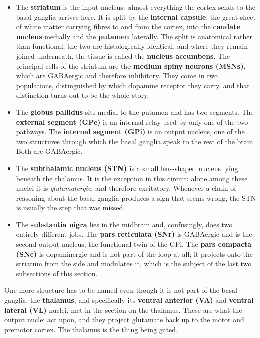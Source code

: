\documentclass[11pt]{article}
\begin{document}
\begin{itemize}
    \item The \textbf{striatum} is the input nucleus: almost everything the cortex sends to the basal ganglia arrives here. It is split by the \textbf{internal capsule}, the great sheet of white matter carrying fibres to and from the cortex, into the \textbf{caudate nucleus} medially and the \textbf{putamen} laterally. The split is anatomical rather than functional; the two are histologically identical, and where they remain joined underneath, the tissue is called the \textbf{nucleus accumbens}. The principal cells of the striatum are the \textbf{medium spiny neurons (MSNs)}, which are GABAergic and therefore inhibitory. They come in two populations, distinguished by which dopamine receptor they carry, and that distinction turns out to be the whole story.
    \item The \textbf{globus pallidus} sits medial to the putamen and has two segments. The \textbf{external segment (GPe)} is an internal relay used by only one of the two pathways. The \textbf{internal segment (GPi)} is an output nucleus, one of the two structures through which the basal ganglia speak to the rest of the brain. Both are GABAergic.
    \item The \textbf{subthalamic nucleus (STN)} is a small lens-shaped nucleus lying beneath the thalamus. It is the exception in this circuit: alone among these nuclei it is \textit{glutamatergic}, and therefore excitatory. Whenever a chain of reasoning about the basal ganglia produces a sign that seems wrong, the STN is usually the step that was missed.
    \item The \textbf{substantia nigra} lies in the midbrain and, confusingly, does two entirely different jobs. The \textbf{pars reticulata (SNr)} is GABAergic and is the second output nucleus, the functional twin of the GPi. The \textbf{pars compacta (SNc)} is dopaminergic and is not part of the loop at all; it projects onto the striatum from the side and modulates it, which is the subject of the last two subsections of this section.
\end{itemize}

One more structure has to be named even though it is not part of the basal ganglia: the \textbf{thalamus}, and specifically its \textbf{ventral anterior (VA)} and \textbf{ventral lateral (VL)} nuclei, met in the section on the thalamus. These are what the output nuclei act upon, and they project glutamate back up to the motor and premotor cortex. The thalamus is the thing being gated.
\end{document}
